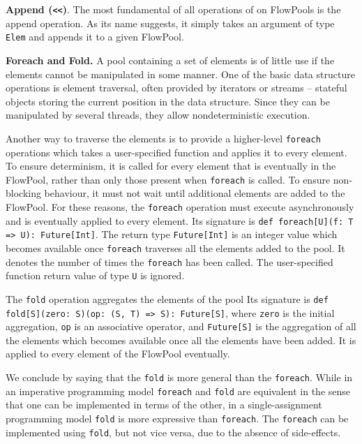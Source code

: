 \documentclass[runningheads,a4paper]{llncs}
\begin{document}
\textbf{Append (\texttt{<<})}. The most fundamental of all
operations of on FlowPools is the append operation. As its name suggests, it
simply takes an argument of type \texttt{Elem} and appends it to a given
FlowPool. 



\textbf{Foreach and Fold.}
A pool containing a set of elements is of little use if the elements
cannot be manipulated in some manner.
One of the basic data structure operations is element traversal,
often provided by iterators or streams -- stateful
objects storing the current position in the data structure.
Since they can be manipulated by several threads, they allow
nondeterministic execution.

Another way to traverse the elements is to provide a higher-level
\verb=foreach= operations which takes a user-specified function and
applies it to every element.
To ensure determinism, it is called for every element that is
eventually in the FlowPool, rather than only those present
when \verb=foreach= is called.
To ensure non-blocking behaviour, it must not wait until
additional elements are added to the FlowPool.
For these reasons, the \verb=foreach= operation must execute
asynchronously and is eventually applied to every element.
Its signature is \verb+def foreach[U](f: T => U): Future[Int]+.
The return type \verb=Future[Int]= is an integer value which becomes
available once \verb=foreach= traverses all the elements added to the
pool.
It denotes the number of times the \verb=foreach= has been called.
The user-specified function return value of type \verb=U= is ignored.

The \verb=fold= operation aggregates the elements of the pool
Its signature is \verb+def fold[S](zero: S)(op: (S, T) => S): Future[S]+,
where \verb=zero= is the initial aggregation, \verb=op= is an
associative operator, and \verb=Future[S]= is the aggregation
of all the elements which becomes available once all the elements have
been added.
It is applied to every element of the FlowPool eventually.

We conclude by saying that the \verb=fold= is more general than the
\verb=foreach=.
While in an imperative programming model \verb=foreach= and \verb=fold= are
equivalent in the sense that one can be implemented in terms of the
other, in a single-assignment programming model \verb=fold= is more
expressive than \verb=foreach=.
The \verb=foreach= can be implemented using \verb=fold=, but not vice versa,
due to the absence of side-effects.
\end{document}
